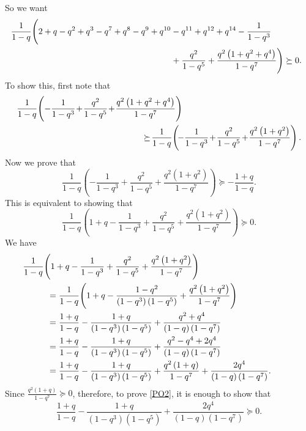 \documentclass[12pt,reqno]{amsart}
\renewcommand{\(}{\left\(}
\renewcommand{\)}{\right\)}
\numberwithin{equation}{section}
\theoremstyle{plain}
\theoremstyle{definition}
\numberwithin{equation}{section}
\begin{document}
So we want
\begin{align}\label{PO}
&\hspace{-.2cm}\frac{1}{1-q}\Biggl(2+q-q^2+q^3-q^7+q^8-q^9+q^{10}-q^{11}+q^{12}+q^{14}- \frac{1}{1-q^3} \nonumber\\
&\hspace{6.4cm}+ \frac{q^2}{1-q^5}+\frac{q^2\left(1+q^2+q^4\right)}{1-q^7}\Biggr) \succeq 0.
\end{align}
To show this, first note that
\begin{align}\label{PO1}
&\frac{1}{1-q}\!\left(- \frac{1}{1-q^3}\!+\! \frac{q^2}{1-q^5}\!+\!\frac{q^2\left(1+q^2+q^4\right)}{1-q^7}\right)\nonumber\\
&\hspace{5.2 cm}\!\succeq\! \frac{1}{1-q}\!\left(\!- \frac{1}{1-q^3}\!+\!\frac{q^2}{1-q^5}\!+\!\frac{q^2\left(1+q^2\right)}{1-q^7}\right).
\end{align}
Now we prove that
\begin{equation}\label{P0}
\frac{1}{1-q}\!\left(- \frac{1}{1-q^3} + \frac{q^2}{1-q^5}+\frac{q^2\left(1+q^2\right)}{1-q^7}\right)\succeq -\frac{1+q}{1-q}.
\end{equation} 
This is equivalent to showing that
\begin{equation}\label{PO2}
\frac{1}{1-q}\!\left(1+q- \frac{1}{1-q^3} + \frac{q^2}{1-q^5}+\frac{q^2\left(1+q^2\right)}{1-q^7}\right)\succeq 0.
\end{equation}
We have
\begin{align*}
&\hspace{-1 cm}\frac{1}{1-q}\!\left(1+q- \frac{1}{1-q^3}+\frac{q^2}{1-q^5}+\frac{q^2\left(1+q^2\right)}{1-q^7}\right)\\
&=\frac{1}{1-q}\!\left(1+q- \frac{1-q^2}{\left(1-q^3\right)\left(1-q^5\right)}+\frac{q^2\left(1+q^2\right)}{1-q^7}\right)\\
&=\frac{1+q}{1-q}-\frac{1+q}{\left(1-q^3\right)\left(1-q^5\right)}+\frac{q^2+q^4}{\left(1-q\right)\left(1-q^7\right)}\\
&=\frac{1+q}{1-q}-\frac{1+q}{\left(1-q^3\right)\left(1-q^5\right)}+\frac{q^2-q^4+2q^4}{\left(1-q\right)\left(1-q^7\right)}\\
&=\frac{1+q}{1-q}-\frac{1+q}{\left(1-q^3\right)\left(1-q^5\right)}+\frac{q^2\left(1+q\right)}{1-q^7}+\frac{2q^4}{\left(1-q\right)\left(1-q^7\right)}.
\end{align*}
Since $\frac{q^2\left(1+q\right)}{1-q^7}\succeq 0$, therefore, to prove \eqref{PO2}, it is enough to show that
\begin{equation}\label{PO3}
\frac{1+q}{1-q}-\frac{1+q}{\left(1-q^3\right)\left(1-q^5\right)}+\frac{2q^4}{\left(1-q\right)\left(1-q^7\right)}\succeq 0.
\end{equation}
\end{document}
